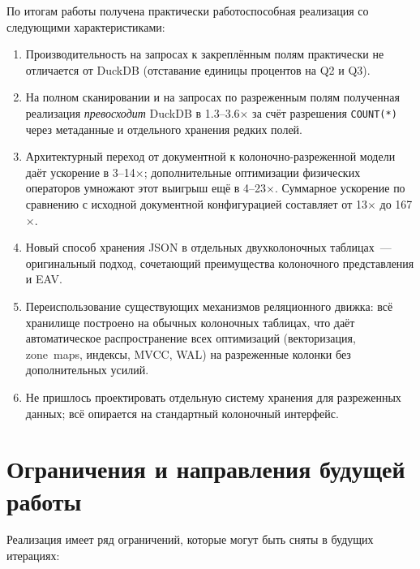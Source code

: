 По итогам работы получена практически работоспособная реализация
со следующими характеристиками:
\begin{enumerate}
    \item Производительность на запросах к закреплённым полям
    практически не отличается от DuckDB (отставание единицы
    процентов на Q2 и Q3).
    \item На полном сканировании и на запросах по разреженным
    полям полученная реализация \emph{превосходит} DuckDB в
    1.3--3.6$\times$ за счёт разрешения \texttt{COUNT(*)} через
    метаданные и отдельного хранения редких полей.
    \item Архитектурный переход от документной к
    колоночно-разреженной модели даёт ускорение в 3--14$\times$;
    дополнительные оптимизации физических операторов умножают этот
    выигрыш ещё в 4--23$\times$. Суммарное ускорение по сравнению с
    исходной документной конфигурацией составляет от 13$\times$ до
    167$\times$.
    \item Новый способ хранения JSON в отдельных двухколоночных
    таблицах~--- оригинальный подход, сочетающий преимущества
    колоночного представления и EAV.
    \item Переиспользование существующих механизмов реляционного
    движка: всё хранилище построено на обычных колоночных
    таблицах, что даёт автоматическое распространение всех
    оптимизаций (векторизация, zone~maps, индексы, MVCC, WAL) на
    разреженные колонки без дополнительных усилий.
    \item Не пришлось проектировать отдельную систему хранения для
    разреженных данных; всё опирается на стандартный колоночный
    интерфейс.
\end{enumerate}

\section{Ограничения и направления будущей работы}

Реализация имеет ряд ограничений, которые могут быть сняты в
будущих итерациях:

